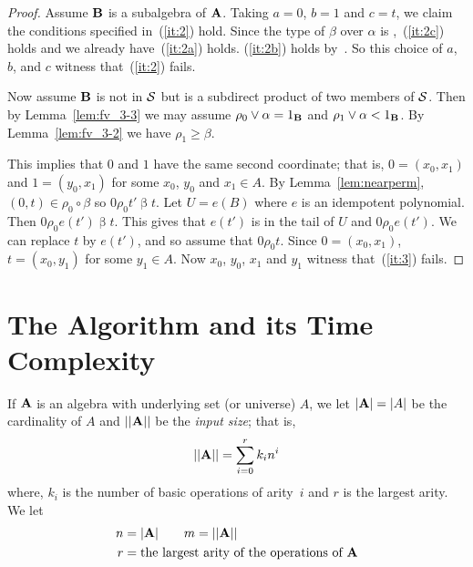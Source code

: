 \begin{proof}
Assume $\mathbf{B}$ is a subalgebra of $\mathbf{A}$. Taking
$a=0$, $b=1$ and $c=t$, we claim the conditions specified
in~(\ref{it:2}) hold.
Since the type of $\beta$ over $\alpha$ is \atyp,~(\ref{it:2c})
holds and we already have~(\ref{it:2a}) holds.
(\ref{it:2b}) holds by~\cite[Theorem~2.4]{KearnesKiss1999}.
So this choice of $a$, $b$, and $c$ witness that~(\ref{it:2}) fails.




Now assume $\mathbf{B}$ is not in $\mathcal{S}$ but is a subdirect
product of two members of $\mathcal{S}$.
Then
by Lemma~\ref{lem:fv_3-3} we may
assume $\rho_0 \join \alpha = 1_{\alg B}$ and
$\rho_1 \join \alpha < 1_{\alg B}$. By Lemma~\ref{lem:fv_3-2}
we have $\rho_1 \ge \beta$.

This implies that $0$ and $1$ have the same second coordinate; that is,
$0 = (x_0,x_1)$ and $1 = (y_0,x_1)$ for some $x_0$, $y_0$ and $x_1\in A$.
By Lemma~\ref{lem:nearperm}, $(0,t) \in \rho_0 \circ \beta$
so $0 \mathrel {\rho_0} t' \mathrel{\beta} t$. Let $U = e(B)$
where $e$ is an idempotent polynomial. Then
$0 \mathrel {\rho_0} e(t') \mathrel{\beta} t$. This gives
that $e(t')$ is in the tail of $U$ and
$0 \mathrel{\rho_0} e(t')$. We can
replace $t$ by $e(t')$, and so assume that
$0 \mathrel{\rho_0} t$.
Since $0 = (x_0,x_1)$, $t = (x_0,y_1)$ for some $y_1\in A$.
Now
$x_0$, $y_0$, $x_1$ and $y_1$ witness that~(\ref{it:3}) fails.
\end{proof}



\section{The Algorithm and its Time Complexity}
\label{sec:algorithm-its-time}
If $\mathbf{A}$ is an algebra with underlying set (or universe) $A$,
we let $|\mathbf{A}| = |A|$ be the cardinality of
$A$ and $||\mathbf{A}||$ be the \emph{input size}; that is,
\[
||\mathbf{A}|| = \sum_{i=0}^r k_i n^i
\]
where, $k_i$ is the number of basic operations of arity~$i$ and $r$
is the largest arity. We let
\begin{align*}
n &= |\mathbf{A}|  \qquad m = ||\mathbf{A}|| \\
r &= \text{the largest arity of the operations of $\mathbf{A}$}
\end{align*}


